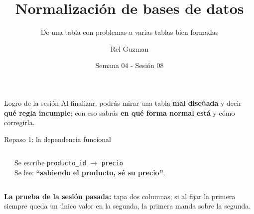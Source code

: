 \documentclass[aspectratio=169,10pt,c]{beamer}
\title{Normalización de bases de datos}
\subtitle{De una tabla con problemas a varias tablas bien formadas}
\date{Semana 04 - Sesión 08}
\author{Rel Guzman}
\newcommand{\fdep}{$\rightarrow$}
\begin{document}
{\maketitle}

\begin{frame}[c]
\begin{block}{Logro de la sesión}
Al finalizar, podrás mirar una tabla \textbf{mal diseñada} y decir \textbf{qué regla incumple}; con eso sabrás \textbf{en qué forma normal está} y cómo corregirla.
\end{block}
\end{frame}

\begin{frame}{Repaso 1: la dependencia funcional}
\vspace{0.3cm}
\begin{columns}[c,onlytextwidth]
\begin{center}
\end{center}
\small Se escribe \texttt{producto\_id} \fdep{} \texttt{precio}\\[5pt]
Se lee: \textbf{``sabiendo el producto, sé su precio''}.
\end{columns}
\vspace{0.35cm}
\small \textbf{La prueba de la sesión pasada:} tapa dos columnas; si al fijar la primera siempre queda un único valor en la segunda, la primera manda sobre la segunda.
\end{frame}
\end{document}
